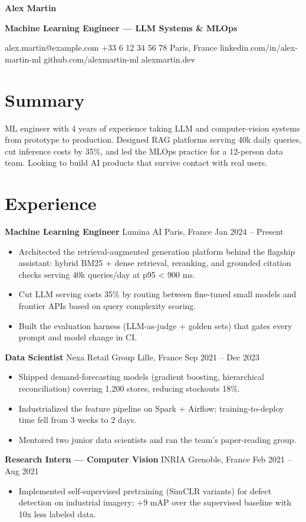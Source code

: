 \documentclass[10pt]{article}
\newcommand{\entry}[3]{\textbf{#1} \textperiodcentered{} #2 \hfill {\color{dim}\small #3}\par}
\begin{document}
{\LARGE\bfseries Alex Martin}\par\vspace{1pt}
{\color{accent}\bfseries Machine Learning Engineer — LLM Systems \& MLOps}\par\vspace{1pt}
{\small\color{dim} alex.martin@example.com \textperiodcentered{} +33 6 12 34 56 78 \textperiodcentered{} Paris, France \textperiodcentered{} linkedin.com/in/alex-martin-ml \textperiodcentered{} github.com/alexmartin-ml \textperiodcentered{} alexmartin.dev}

\section{Summary}
ML engineer with 4 years of experience taking LLM and computer-vision systems from prototype to production. Designed RAG platforms serving 40k daily queries, cut inference costs by 35\%, and led the MLOps practice for a 12-person data team. Looking to build AI products that survive contact with real users.

\section{Experience}
\entry{Machine Learning Engineer}{Lumina AI}{Paris, France \textperiodcentered{} Jan 2024 -- Present}
\begin{itemize}
  \item Architected the retrieval-augmented generation platform behind the flagship assistant: hybrid BM25 + dense retrieval, reranking, and grounded citation checks serving 40k queries/day at p95 \textless{} 900 ms.
  \item Cut LLM serving costs 35\% by routing between fine-tuned small models and frontier APIs based on query complexity scoring.
  \item Built the evaluation harness (LLM-as-judge + golden sets) that gates every prompt and model change in CI.
\end{itemize}
\vspace{3pt}
\entry{Data Scientist}{Nexa Retail Group}{Lille, France \textperiodcentered{} Sep 2021 -- Dec 2023}
\begin{itemize}
  \item Shipped demand-forecasting models (gradient boosting, hierarchical reconciliation) covering 1,200 stores, reducing stockouts 18\%.
  \item Industrialized the feature pipeline on Spark + Airflow; training-to-deploy time fell from 3 weeks to 2 days.
  \item Mentored two junior data scientists and ran the team's paper-reading group.
\end{itemize}
\vspace{3pt}
\entry{Research Intern — Computer Vision}{INRIA}{Grenoble, France \textperiodcentered{} Feb 2021 -- Aug 2021}
\begin{itemize}
  \item Implemented self-supervised pretraining (SimCLR variants) for defect detection on industrial imagery; +9 mAP over the supervised baseline with 10x less labeled data.
\end{itemize}
\end{document}

